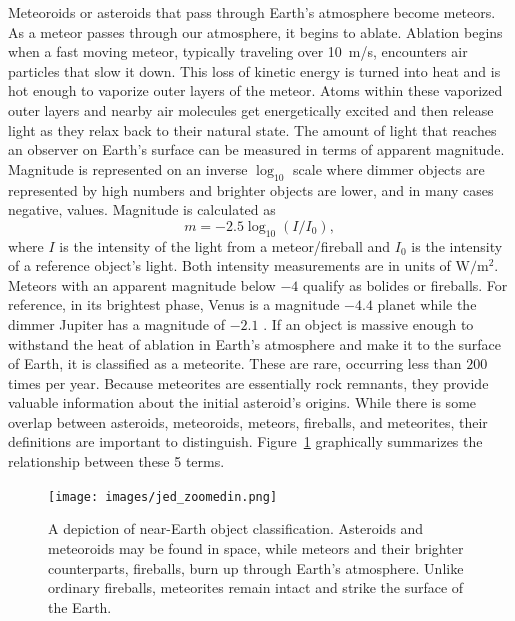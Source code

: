 Meteoroids or asteroids that pass through Earth's atmosphere become meteors.
As a meteor passes through our atmosphere, it begins to ablate.
Ablation begins when a fast moving meteor, typically traveling over \SI{10}{\meter/\second}, encounters air particles that slow it down.
This loss of kinetic energy is turned into heat and is hot enough to vaporize outer layers of the meteor.  
Atoms within these vaporized outer layers and nearby air molecules get energetically excited and then release light as they relax back to their natural state.
The amount of light that reaches an observer on Earth's surface can be measured in terms of apparent magnitude.
Magnitude is represented on an inverse $\log_{10}$ scale where dimmer objects are represented by high numbers and brighter objects are lower, and in many cases negative, values.
Magnitude is calculated as
\begin{equation}
m = -2.5 \log_{10}(I/I_0),
\label{magnitude_equation}
\end{equation}
 where $I$ is the intensity of the light from a meteor/fireball and $I_0$ is the intensity of a reference object's light.  
Both intensity measurements are in units of $\si{\watt/\meter^2}$.
Meteors with an apparent magnitude below $-4$ qualify as bolides or fireballs.
For reference, in its brightest phase, Venus is a magnitude $-4.4$ planet while the dimmer Jupiter has a magnitude of $-2.1$ \cite{rao_venus_nodate}.
If an object is massive enough to withstand the heat of ablation in Earth's atmosphere and make it to the surface of Earth, it is classified as a meteorite. 
These are rare, occurring less than $200$ times per year.
Because meteorites are essentially rock remnants, they provide valuable information about the initial asteroid's origins.
While there is some overlap between asteroids, meteoroids, meteors, fireballs, and meteorites, their definitions are important to distinguish.
Figure~\ref{jed} graphically summarizes the relationship between these 5 terms.

\begin{figure}[ht!]
  \centering
  \texttt{[image: images/jed\_zoomedin.png]}
  \caption[A depiction of near-Earth object classification.]{A depiction of near-Earth object classification.  Asteroids and meteoroids may be found in space, while meteors and their brighter counterparts, fireballs, burn up through Earth's atmosphere.  Unlike ordinary fireballs, meteorites remain intact and strike the surface of the Earth.}
  \label{jed}
\end{figure}

